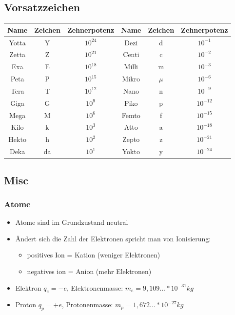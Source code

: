 \documentclass[12pt,a4paper]{article}%
\numberwithin{equation}{section}
\begin{document}
\subsection{Vorsatzzeichen}
\begin{tabular} {|c|c|c|c|c|c|} \hline
Name & Zeichen & Zehnerpotenz & Name & Zeichen & Zehnerpotenz \\ \hline
Yotta & Y & $10^{24}$ & Dezi & d & $10^{-1}$ \\ \hline
Zetta & Z & $10^{21}$ & Centi & c & $10^{-2}$ \\ \hline
Exa & E & $10^{18}$ & Milli & m & $10^{-3}$ \\ \hline
Peta & P & $10^{15}$ & Mikro & $\mu$ & $10^{-6}$ \\ \hline
Tera & T & $10^{12}$ & Nano & n & $10^{-9}$ \\ \hline
Giga & G & $10^{9}$ & Piko & p & $10^{-12}$ \\ \hline
Mega & M & $10^{6}$ & Femto & f & $10^{-15}$ \\ \hline
Kilo & k & $10^{3}$ & Atto & a & $10^{-18}$ \\ \hline
Hekto & h & $10^{2}$ & Zepto & z & $10^{-21}$ \\ \hline
Deka & da & $10^{1}$ & Yokto & y & $10^{-24}$ \\ \hline
\end{tabular}

\subsection{Misc}
\subsubsection{Atome}
\begin{itemize}
\item Atome sind im Grundzustand neutral
\item Ändert sich die Zahl der Elektronen spricht man von Ionisierung:
\begin{itemize}
\item positives Ion = Kation (weniger Elektronen)
\item negatives ion = Anion (mehr Elektronen)
\end{itemize}
\item Elektron $q_e = -e$, Elektronenmasse: $m_e = 9,109... * 10^{-31}kg$ 
\item Proton $q_p = +e$, Protonenmasse: $m_p = 1,672... * 10^{-27}kg$
\end{itemize}
\end{document}

